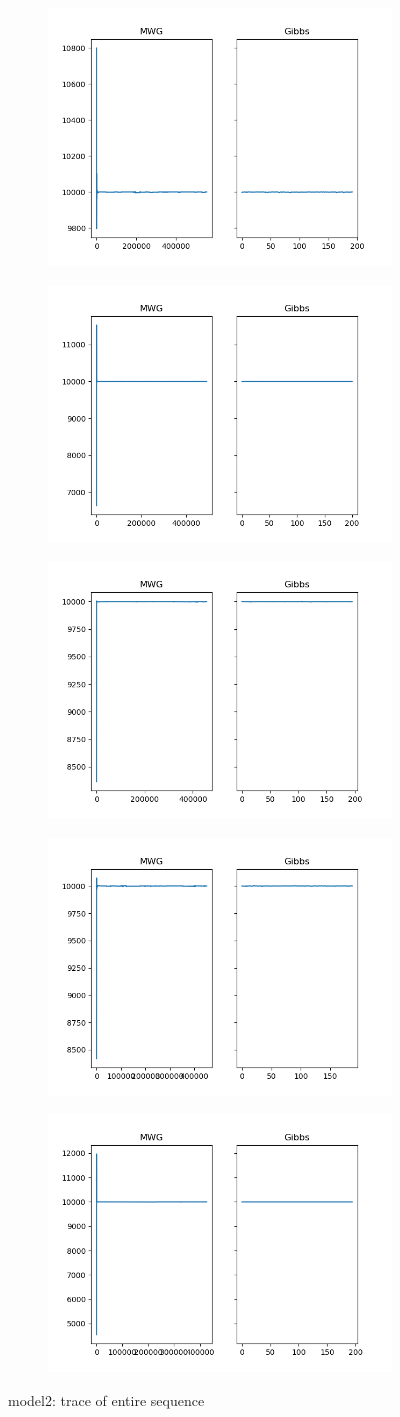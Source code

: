 \begin{figure}[h]
    \centering
    \begin{subfigure}
    	\centering
        \includegraphics[width=0.3\linewidth]{../../plots/Trace_M2_N20000_NMCMC3_seed0_diffind2.png}
    \end{subfigure}
    \begin{subfigure}
        \centering
    	\includegraphics[width=0.3\linewidth]{../../plots/Trace_M2_N20000_NMCMC3_seed1_diffind2.png}
	\end{subfigure}
	\begin{subfigure}
	    \centering
    	\includegraphics[width=0.3\linewidth]{../../plots/Trace_M2_N20000_NMCMC3_seed2_diffind2.png}
	\end{subfigure}
	\begin{subfigure}
	    \centering
    	\includegraphics[width=0.3\linewidth]{../../plots/Trace_M2_N20000_NMCMC3_seed3_diffind2.png}
	\end{subfigure}
	\begin{subfigure}
	    \centering
    	\includegraphics[width=0.3\linewidth]{../../plots/Trace_M2_N20000_NMCMC3_seed4_diffind2.png}
	\end{subfigure}
	\caption{model2: trace of entire sequence}
\end{figure}

